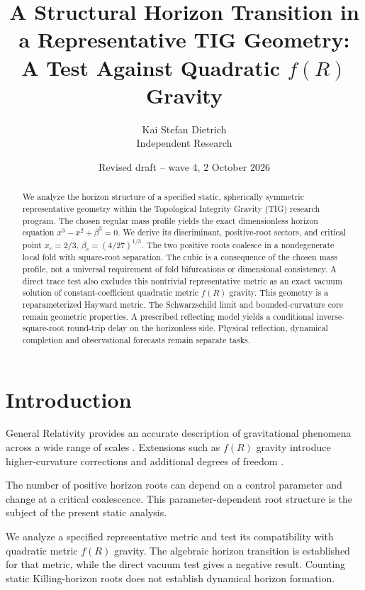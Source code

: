 \documentclass[11pt,final]{article}
\title{A Structural Horizon Transition in a Representative TIG Geometry:\\
A Test Against Quadratic $f(R)$ Gravity}
\author{Kai Stefan Dietrich\\
Independent Research}
\date{Revised draft -- wave 4, 2 October 2026}
\begin{document}
\maketitle

\begin{abstract}
We analyze the horizon structure of a specified static, spherically symmetric
representative geometry within the Topological Integrity Gravity (TIG) research
program. The chosen regular mass profile yields the exact dimensionless horizon
equation \(x^3-x^2+\beta^3=0\). We derive its discriminant, positive-root sectors,
and critical point \(x_c=2/3\), \(\beta_c=(4/27)^{1/3}\). The two positive roots
coalesce in a nondegenerate local fold with square-root separation. The cubic
is a consequence of the chosen mass profile, not a universal requirement of
fold bifurcations or dimensional consistency. A direct trace test also excludes
this nontrivial representative metric as an exact vacuum solution of
constant-coefficient quadratic metric \(f(R)\) gravity. This geometry is a reparameterized Hayward metric.
The Schwarzschild limit and bounded-curvature core remain geometric properties.
A prescribed reflecting model yields a conditional inverse-square-root
round-trip delay on the horizonless side. Physical reflection, dynamical
completion and observational forecasts remain separate tasks.
\end{abstract}

\section{Introduction}

General Relativity provides an accurate description of gravitational phenomena across a wide range of scales \cite{einstein1915,wald1984}. Extensions such as $f(R)$ gravity introduce higher-curvature corrections and additional degrees of freedom \cite{sotiriou2010,defelice2010}.

The number of positive horizon roots can depend on a control parameter and change at a critical coalescence. This parameter-dependent root structure is the subject of the present static analysis.

We analyze a specified representative metric and test its compatibility with
quadratic metric $f(R)$ gravity. The algebraic horizon transition is established
for that metric, while the direct vacuum test gives a negative result. Counting
static Killing-horizon roots does not establish dynamical horizon formation.
\end{document}
